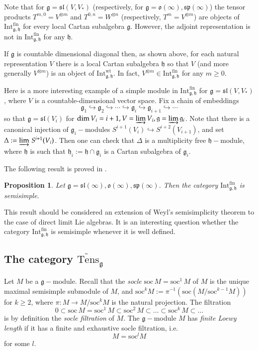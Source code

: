 \documentclass[10pt]{amsart}
\newcounter{theorem}
\newtheorem{prop}[theo]{Proposition}
\newcommand{\wt}{\mathrm{wt}}
\renewcommand{\sp}{\mathfrak{sp}}
\renewcommand{\sl}{\mathfrak{sl}}
\newcommand{\oo}{\mathfrak{o}}
\newcommand{\hh}{\mathfrak{h}}
\renewcommand{\gg}{\mathfrak{g}}
\newcommand{\Int}{\mathrm{Int}}
\newcommand{\fin}{\mathrm{fin}}
\newcommand{\Soc}{\mathrm{soc}}
\begin{document}
Note that for $\gg = \sl(V,V_*)$ (respectively, for $\gg = \oo(\infty), \sp(\infty)$) the tensor products $T^{m,0} = V^{\otimes m}$ and $T^{0,n} = W^{\otimes n}$ (respectively, $T^m = V^{\otimes m}$) are objects of $\Int_{\gg,\hh}^\fin$ for every local Cartan subalgebra $\gg$. However, the adjoint representation is not in $\Int_{\gg,\hh}^\fin$ for any $\hh$.

If $\gg$ is countable dimensional diagonal then, as shown above, for each natural representation $V$ there is a local Cartan subalgebra $\hh$ so that $V$ (and more generally $V^{\otimes m}$) is an object of $\Int^{\wt}_{\gg,\hh}$. In fact, $V^{\otimes m} \in \Int_{\gg,\hh}^\fin$ for any $m \geq 0$. 

Here is a more interesting example of a simple module in $\Int_{\gg,\hh}^\fin$ for $\gg = \sl(V,V_*)$, where $V$ is a countable-dimensional vector space. Fix a chain of embeddings $$
\gg_1 \hookrightarrow \gg_2 \hookrightarrow \cdots \hookrightarrow \gg_i \hookrightarrow \gg_{i+1} \hookrightarrow \cdots$$ so that $\gg = \sl(V_{i})$ for $\mathrm{dim}\,V_i = i+1, V = \varinjlim V_i, \gg = \varinjlim \gg_i$. Note that there is a canonical injection of $\gg_i-$modules $S^{i+1}(V_{i}) \hookrightarrow S^{i+2}(V_{i+1})$, and set $\Delta:=\varinjlim\,S^{i+1}(V_i)$. Then one can check that $\Delta$ is a multiplicity free $\hh-$module, where $\hh$ is such that $\hh_i := \hh \cap \gg_i$ is a Cartan subalgebra of $\gg_i$.

The following result is proved in \cite{ps}.

\begin{prop}\label{prop_ps} Let  $\gg=\sl(\infty),\oo(\infty),\sp(\infty)$.
Then the category $\mathrm{Int}_{\gg,\hh}^\fin$ is semisimple.  
\end{prop}
This result should be considered an extension of Weyl's semisimplicity theorem to the case of direct limit Lie algebras. It is an interesting question whether the category $\mathrm{Int}_{\gg,\hh}^\fin$ is semisimple whenever it is well defined. 

\subsection{The category $\widetilde{\mathrm{Tens}}_{\gg}$}\label{sect:3.4}
Let $M$ be a $\gg-$module. 
Recall that the \textit{socle} $\Soc\,M = \Soc^1\,M$ of $M$ is the unique maximal semisimple submodule of 
$M$, and $\mathrm{soc}^kM:=\pi^{-1}(\mathrm{soc}(M/\mathrm{soc}^{k-1}M))$ for $k \geq 2$, where $\pi : M \rightarrow M/\mathrm{soc}^k M$ is the natural projection. The filtration 
\begin{equation}\label{eq.filt}
 0 \subset \Soc\,M = \Soc^1\,M \subset \Soc^2\,M\subset \dots\subset\Soc^k\,M\subset\dots
\end{equation}
is by definition the \textit{socle filtration} of $M$.
The $\gg-$module $M$ has \textit{finite Loewy length} if it has a finite and exhaustive socle filtration, i.e.
\begin{equation}\label{soc_filt}
 M = \mathrm{soc}^l M
\end{equation}
for some $l$. 
\end{document}
